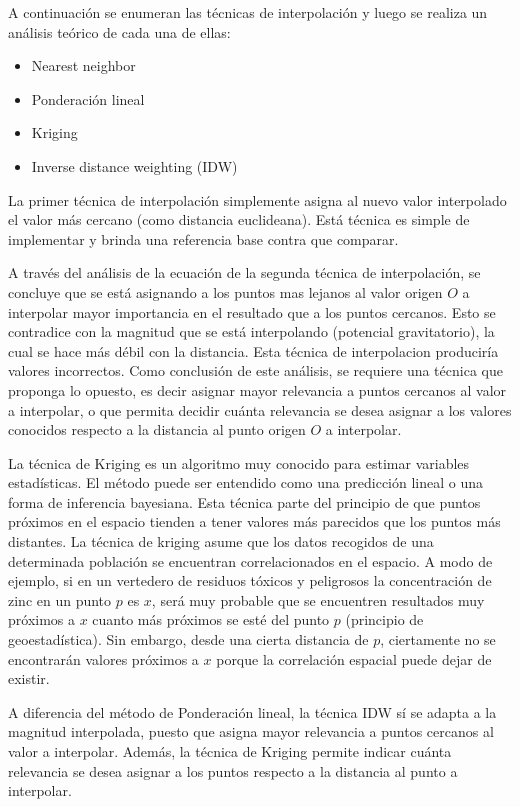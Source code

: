 \documentclass[a4paper,11pt]{book}
\begin{document}
A continuación se enumeran las técnicas de interpolación y luego se realiza un análisis teórico de cada una de ellas:

\begin{itemize}
	\item Nearest neighbor
	\item Ponderación lineal
	\item Kriging
	\item Inverse distance weighting (IDW)
\end{itemize}

La primer técnica de interpolación simplemente asigna al nuevo valor interpolado el valor más cercano (como distancia euclideana). Está técnica es simple de implementar y brinda una referencia base contra que comparar.

A través del análisis de la ecuación de la segunda técnica de interpolación, se concluye que se está asignando a los puntos mas lejanos al valor origen $O$ a interpolar mayor importancia en el resultado que a los puntos cercanos. Esto se contradice con la magnitud que se está interpolando (potencial gravitatorio), la cual se hace más débil con la distancia. Esta técnica de interpolacion produciría valores incorrectos. Como conclusión de este análisis, se requiere una técnica que proponga lo opuesto, es decir asignar mayor relevancia a puntos cercanos al valor a interpolar, o que permita decidir cuánta relevancia se desea asignar a los valores conocidos respecto a la distancia al punto origen $O$ a interpolar.

La técnica de Kriging es un algoritmo muy conocido para estimar variables estadísticas. El método puede ser entendido como una predicción lineal o una forma de inferencia bayesiana. Esta técnica parte del principio de que puntos próximos en el espacio tienden a tener valores más parecidos que los puntos más distantes. La técnica de kriging asume que los datos recogidos de una determinada población se encuentran correlacionados en el espacio. A modo de ejemplo, si en un vertedero de residuos tóxicos y peligrosos la concentración de zinc en un punto $p$ es $x$, será muy probable que se encuentren resultados muy próximos a $x$ cuanto más próximos se esté del punto $p$ (principio de geoestadística). Sin embargo, desde una cierta distancia de $p$, ciertamente no se encontrarán valores próximos a $x$ porque la correlación espacial puede dejar de existir.

A diferencia del método de Ponderación lineal, la técnica IDW sí se adapta a la magnitud interpolada, puesto que asigna mayor relevancia a puntos cercanos al valor a interpolar. Además, la técnica de Kriging permite indicar cuánta relevancia se desea asignar a los puntos respecto a la distancia al punto a interpolar.
\end{document}
